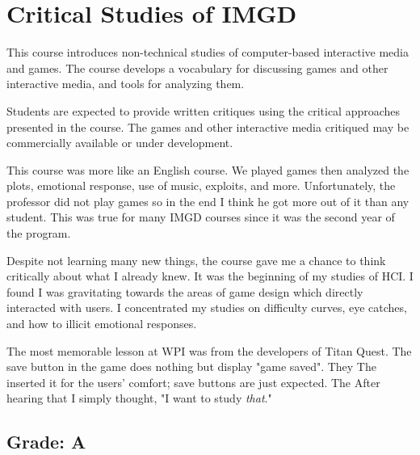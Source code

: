 \section{Critical Studies of IMGD}

\begin{meta}
\end{meta}


\coursedesc
This course introduces non-technical studies of computer-based
interactive media and games. The course develops a vocabulary for
discussing games and other interactive media, and tools for analyzing
them.

Students are expected to provide written critiques using the critical
approaches presented in the course. The games and other interactive
media critiqued may be commercially available or under development.


\courseself
This course was more like an English course. We played games then
analyzed the plots, emotional response, use of music, exploits, and
more. Unfortunately, the professor did not play games so in the end I
think he got more out of it than any student. This was true for many
IMGD courses since it was the second year of the program.

Despite not learning many new things, the course gave me a chance to
think critically about what I already knew. It was the beginning of
my studies of HCI. I found I was gravitating towards the areas of
game design which directly interacted with users. I concentrated my
studies on difficulty curves, eye catches, and how to illicit emotional
responses.

The most memorable lesson at WPI was from the developers of Titan Quest.
The save button in the game does nothing but display "game saved". They
The inserted it for the users' comfort; save buttons are just expected.
The After hearing that I simply thought, "I want to study \emph{that}."


\subsection*{Grade: A}
